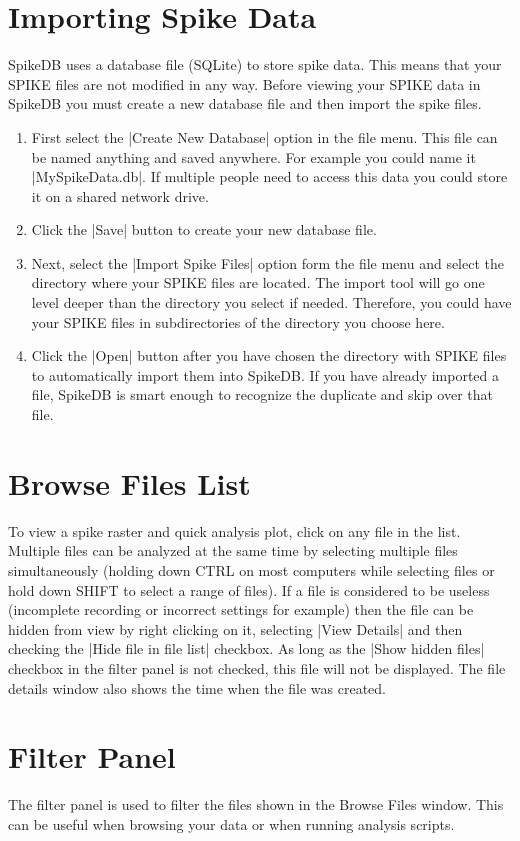\documentclass{report}
\begin{document}
		
\clearpage
\section{Importing Spike Data}
SpikeDB uses a database file (SQLite) to store spike data. This means that your SPIKE files are not modified in any way. Before viewing your SPIKE data in SpikeDB you must create a new database file and then import the spike files.
\begin{enumerate}
	\item First select the |Create New Database| option in the file menu. This file can be named anything and saved anywhere. For example you could name it |MySpikeData.db|. If multiple people need to access this data you could store it on a shared network drive.
	\item Click the |Save| button to create your new database file.
	\item  Next, select the |Import Spike Files| option form the file menu and select the directory where your SPIKE files are located. The import tool will go one level deeper than the directory you select if needed.  Therefore, you could have your SPIKE files in subdirectories of the directory you choose here.
	\item Click the |Open| button after you have chosen the directory with SPIKE files to automatically import them into SpikeDB. If you have already imported a file, SpikeDB is smart enough to recognize the duplicate and skip over that file.
\end{enumerate}


\section{Browse Files List}
To view a spike raster and quick analysis plot, click on any file in the list. Multiple files can be analyzed at the same time by selecting multiple files simultaneously (holding down CTRL on most computers while selecting files or hold down SHIFT to select a range of files). If a file is considered to be useless (incomplete recording or incorrect settings for example) then the file can be hidden from view by right clicking on it, selecting |View Details| and then checking the |Hide file in file list| checkbox.  As long as the |Show hidden files| checkbox in the filter panel is not checked, this file will not be displayed. The file details window also shows the time when the file was created.

\section{Filter Panel}
The filter panel is used to filter the files shown in the Browse Files window. This can be useful when browsing your data or when running analysis scripts.
\end{document}
